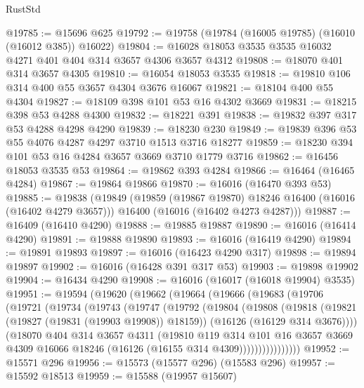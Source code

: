 \begin{lexlean}{RustStd}
\begin{coremodule}
@19785 := @15696 @625
@19792 := @19758 (@19784 (@16005 @19785) (@16010 (@16012 @385)) @16022)
@19804 := @16028 @18053 @3535 @3535 @16032 @4271 @401 @404 @314 @3657 @4306 @3657 @4312
@19808 := @18070 @401 @314 @3657 @4305
@19810 := @16054 @18053 @3535
@19818 := @19810 @106 @314 @400 @55 @3657 @4304 @3676 @16067
@19821 := @18104 @400 @55 @4304
@19827 := @18109 @398 @101 @53 @16 @4302 @3669
@19831 := @18215 @398 @53 @4288 @4300
@19832 := @18221 @391
@19838 := @19832 @397 @317 @53 @4288 @4298 @4290
@19839 := @18230 @230
@19849 := @19839 @396 @53 @55 @4076 @4287 @4297 @3710 @1513 @3716 @18277
@19859 := @18230 @394 @101 @53 @16 @4284 @3657 @3669 @3710 @1779 @3716
@19862 := @16456 @18053 @3535 @53
@19864 := @19862 @393 @4284
@19866 := @16464 (@16465 @4284)
@19867 := @19864 @19866
@19870 := @16016 (@16470 @393 @53)
@19885 := @19838
    (@19849
      (@19859 (@19867 @19870) @18246 @16400 (@16016 (@16402 @4279 @3657)))
      @16400
      (@16016 (@16402 @4273 @4287)))
@19887 := @16409 (@16410 @4290)
@19888 := @19885 @19887
@19890 := @16016 (@16414 @4290)
@19891 := @19888 @19890
@19893 := @16016 (@16419 @4290)
@19894 := @19891 @19893
@19897 := @16016 (@16423 @4290 @317)
@19898 := @19894 @19897
@19902 := @16016 (@16428 @391 @317 @53)
@19903 := @19898 @19902
@19904 := @16434 @4290
@19908 := @16016 (@16017 (@16018 @19904) @3535)
@19951 := @19594
    (@19620
      (@19662
        (@19664
          (@19666
            (@19683
              (@19706
                (@19721
                  (@19734
                    (@19743
                      (@19747
                        (@19792
                          (@19804
                            (@19808
                              (@19818
                                (@19821 (@19827 (@19831 (@19903 @19908)) @18159))
                                (@16126 (@16129 @314 @3676))))
                            (@18070
                              @404
                              @314
                              @3657
                              @4311
                              (@19810
                                @119
                                @314
                                @101
                                @16
                                @3657
                                @3669
                                @4309
                                @16066
                                @18246
                                (@16126 (@16155 @314 @4309))))))))))))))))
@19952 := @15571 @296
@19956 := @15573 (@15577 @296) (@15583 @296)
@19957 := @15592 @18513
@19959 := @15588 (@19957 @15607)

\end{coremodule}
\end{lexlean}
